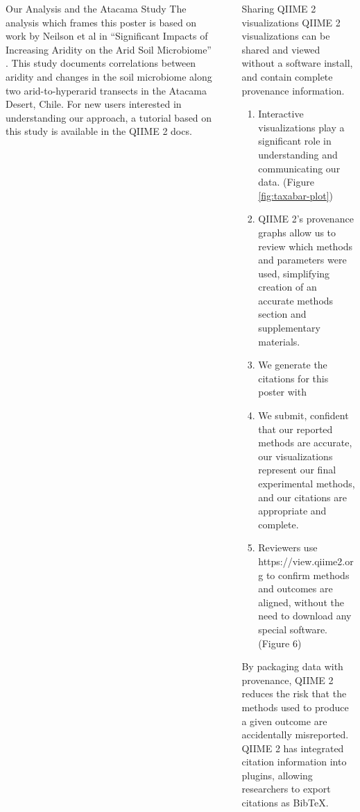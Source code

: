 \documentclass[final]{beamer}
\newlength{\sepwidth}
\newlength{\colwidth}
\newcommand{\separatorcolumn}{\begin{column}{\sepwidth}\end{column}}
\begin{document}
\begin{frame}[t]
\begin{columns}[t]
\begin{column}{\colwidth}
  \begin{block}{Our Analysis and the Atacama Study}
    The analysis which frames this poster is based on work by Neilson et al in
    “Significant Impacts of Increasing Aridity on the Arid Soil Microbiome”
    \cite{Neilsone00195-16}. This study documents correlations between aridity
    and changes in the soil microbiome along two arid-to-hyperarid transects in
    the Atacama Desert, Chile. For new users interested in understanding
    our approach, a tutorial based on this study is available in the
    QIIME 2 docs.
  \end{block}

\end{column}

\separatorcolumn

\begin{column}{\colwidth}

    \begin{block}{Sharing QIIME 2 visualizations}
      QIIME 2 visualizations can be shared and viewed without a software
      install, and contain complete provenance information.

    \begin{enumerate}
      \item Interactive visualizations play a significant role in understanding and
      communicating our data. (Figure \ref{fig:taxabar-plot})
      \item QIIME 2’s provenance graphs allow us to review which methods and
      parameters were used, simplifying creation of an accurate methods section
      and supplementary materials.
      \item We generate the citations for this poster with 
      \item We submit, confident that our reported methods are accurate, our
      visualizations represent our final experimental methods, and our
      citations are appropriate and complete.
      \item Reviewers use https://view.qiime2.org to confirm methods and outcomes are
      aligned, without the need to download any special software. (Figure 6)
    \end{enumerate}

    \begin{tcolorbox}
    [width=\textwidth, colframe=blue]
    {By packaging data with provenance, QIIME 2 reduces the risk that the
    methods used to produce a given outcome are accidentally misreported.
    QIIME 2 has integrated citation information into plugins, allowing
    researchers to export citations as BibTeX}.
    \end{tcolorbox}



\end{block}
\end{column}
\end{columns}
\end{frame}
\end{document}
